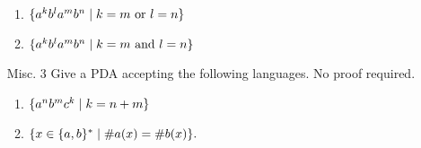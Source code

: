 \documentclass{article}
\newcommand{\setst}{\hspace{1mm} | \hspace{1mm} }
\theoremstyle{definition}
\begin{document}
\begin{enumerate}
\begin{enumerate}
	\item $\{a^k b^l a^m b^n \setst k = m \text{ or } l = n \}$ 
	\item $\{a^k b^l a^m b^n \setst k = m \text{ and } l = n\}$
\end{enumerate}
\item[Misc. 3] Give a PDA accepting the following languages.  No proof required.
\begin{enumerate}
\item  $\{a^n b^m c^k \setst k = n + m\}$ 
\item $\{x \in \{a,b\}^* \setst \#a(x) = \#b(x)\}.$ 
\end{enumerate}
\end{enumerate}
\end{document}

